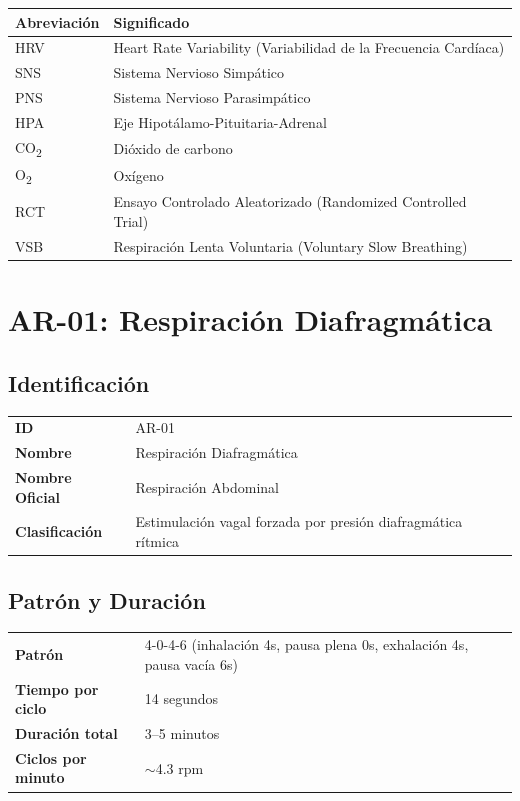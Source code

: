 \documentclass[12pt,a4paper]{article}
\begin{document}
\vspace{0.3cm}
\begin{tabularx}{\textwidth}{lX}
    \toprule
    \textbf{Abreviación} & \textbf{Significado} \\
    \midrule
    HRV & Heart Rate Variability (Variabilidad de la Frecuencia Cardíaca) \\
    SNS & Sistema Nervioso Simpático \\
    PNS & Sistema Nervioso Parasimpático \\
    HPA & Eje Hipotálamo-Pituitaria-Adrenal \\
    CO\textsubscript{2} & Dióxido de carbono \\
    O\textsubscript{2} & Oxígeno \\
    RCT & Ensayo Controlado Aleatorizado (Randomized Controlled Trial) \\
    VSB & Respiración Lenta Voluntaria (Voluntary Slow Breathing) \\
    \bottomrule
\end{tabularx}

\newpage

\section{AR-01: Respiración Diafragmática}
\label{ar:01}

\subsection*{Identificación}
\begin{tabularx}{\textwidth}{lX}
    \textbf{ID} & AR-01 \\
    \textbf{Nombre} & Respiración Diafragmática \\
    \textbf{Nombre Oficial} & Respiración Abdominal \\
    \textbf{Clasificación} & Estimulación vagal forzada por presión diafragmática rítmica \\
\end{tabularx}

\subsection*{Patrón y Duración}
\begin{tabularx}{\textwidth}{lX}
    \textbf{Patrón} & 4-0-4-6 (inhalación 4s, pausa plena 0s, exhalación 4s, pausa vacía 6s) \\
    \textbf{Tiempo por ciclo} & 14 segundos \\
    \textbf{Duración total} & 3--5 minutos \\
    \textbf{Ciclos por minuto} & $\sim$4.3 rpm \\
\end{tabularx}
\end{document}
